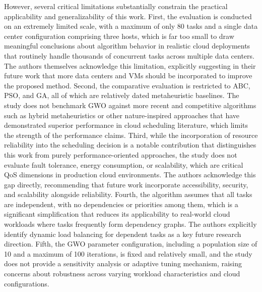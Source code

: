 \documentclass[pdflatex,sn-mathphys-num]{sn-jnl}%
\theoremstyle{thmstyleone}%
\theoremstyle{thmstyletwo}%
\theoremstyle{thmstylethree}%
\begin{document}
However, several critical limitations substantially constrain the practical 
applicability and generalizability of this work. First, the evaluation is conducted 
on an extremely limited scale, with a maximum of only 80 tasks and a single data 
center configuration comprising three hosts, which is far too small to draw 
meaningful conclusions about algorithm behavior in realistic cloud deployments 
that routinely handle thousands of concurrent tasks across multiple data centers. 
The authors themselves acknowledge this limitation, explicitly suggesting in their 
future work that more data centers and VMs should be incorporated to improve the 
proposed method. Second, the comparative evaluation is restricted to ABC, PSO, 
and GA, all of which are relatively dated metaheuristic baselines. The study does 
not benchmark GWO against more recent and competitive algorithms such as hybrid 
metaheuristics or other nature-inspired approaches that have demonstrated superior 
performance in cloud scheduling literature, which limits the strength of the 
performance claims. Third, while the incorporation of resource reliability into 
the scheduling decision is a notable contribution that distinguishes this work 
from purely performance-oriented approaches, the study does not evaluate fault 
tolerance, energy consumption, or scalability, which are critical QoS dimensions 
in production cloud environments. The authors acknowledge this gap directly, 
recommending that future work incorporate accessibility, security, and scalability 
alongside reliability. Fourth, the algorithm assumes that all tasks are 
independent, with no dependencies or priorities among them, which is a significant 
simplification that reduces its applicability to real-world cloud workloads where 
tasks frequently form dependency graphs. The authors explicitly identify dynamic 
load balancing for dependent tasks as a key future research direction. Fifth, the 
GWO parameter configuration, including a population size of 10 and a maximum of 
100 iterations, is fixed and relatively small, and the study does not provide a 
sensitivity analysis or adaptive tuning mechanism, raising concerns about 
robustness across varying workload characteristics and cloud configurations.
\end{document}
